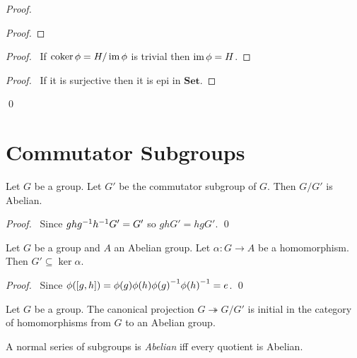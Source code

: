 \begin{proof}
\pf
{}
\begin{proof}
\end{proof}
\begin{proof}
	\pf\ If $\operatorname{coker} \phi = H / \operatorname{im} \phi$ is trivial then $\operatorname{im} \phi = H$.
\end{proof}
\begin{proof}
	\pf\ If it is surjective then it is epi in $\mathbf{Set}$.
\end{proof}
\qed
\end{proof}

\section{Commutator Subgroups}

\begin{prop}
Let $G$ be a group. Let $G'$ be the commutator subgroup of $G$. Then $G / G'$ is Abelian.
\end{prop}

\begin{proof}
\pf\ Since $gh{g}^{-1}{h}^{-1}G' = G'$ so $ghG' = hgG'$. \qed
\end{proof}

\begin{prop}
Let $G$ be a group and $A$ an Abelian group. Let $\alpha : G \rightarrow A$ be a homomorphism. Then $G' \subseteq \ker \alpha$.
\end{prop}

\begin{proof}
\pf\ Since $\phi([g,h]) = \phi(g) \phi(h) {\phi(g)}^{-1} {\phi(h)}^{-1} = e$. \qed
\end{proof}

\begin{cor}
Let $G$ be a group.
The canonical projection $G \twoheadrightarrow G / G'$ is initial in the category of homomorphisms from $G$ to an Abelian group.
\end{cor}

\begin{df}
A normal series of subgroups is \emph{Abelian} iff every quotient is Abelian.
\end{df}


